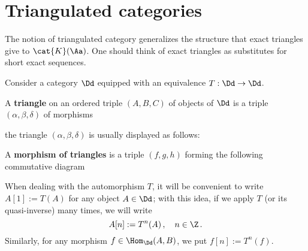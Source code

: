 
\section{Triangulated categories}

The notion of triangulated category generalizes the structure 
that exact triangles give to $\cat{K}(\Aa)$. 
One should think of exact triangles as 
substitutes for short exact sequences.

Consider a category $\Dd$ equipped with 
an equivalence $T:\Dd \to \Dd$.
\begin{df}
    A \textbf{triangle} on an ordered triple
    $(A,B,C)$ of objects of $\Dd$ is a 
    triple $(\alpha,\beta,\delta)$ of morphisms
    \begin{center}
    \end{center}
    the triangle $(\alpha,\beta,\delta)$ 
    is usually displayed as follows:
    \begin{center}
    \end{center}
    A \textbf{morphism of triangles} is a triple $(f,g,h)$
    forming the following commutative diagram %
    \begin{center}
    \end{center}
\end{df}

\begin{notation}
    When dealing with the automorphism $T$,
    it will be convenient to write
    $A[1] := T(A)$ for any object $A \in \Dd$;
    with this idea, if we apply $T$ (or its quasi-inverse)
    many times, we will write
    \begin{equation*}
        A[n] := T^{n}(A)\,, \quad n \in \Z\,.
    \end{equation*}
    Similarly, for any morphism $f \in \Hom_{\Dd}(A,B)$,
    we put $f[n] := T^{n}(f)$.
\end{notation}

